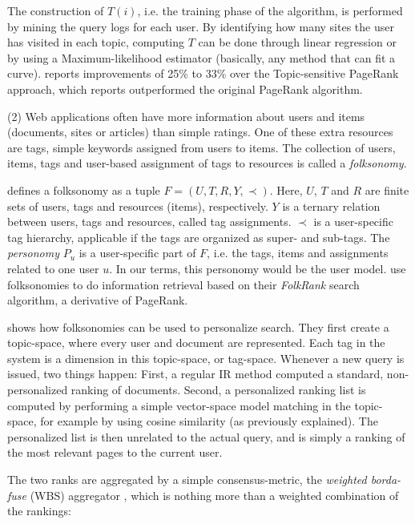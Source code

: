 The construction of $T(i)$, i.e. the training phase of the algorithm, is performed by mining the query logs for each user.
By identifying how many sites the user has visited in each topic, computing $T$ can be done through linear regression or
by using a Maximum-likelihood estimator (basically, any method that can fit a curve).
\citet[p10]{Qiu2006} reports improvements of 25\% to 33\% over the Topic-sensitive PageRank approach, which 
\citet{Haveliwala2003} reports outperformed the original PageRank algorithm.


(2) Web applications often have more information about users and items (documents, sites or articles) 
than simple ratings. One of these extra resources are tags, simple keywords assigned from users to items. 
The collection of users, items, tags and user-based assignment of tags to resources is called a \emph{folksonomy}.

\cite{Hotho} defines a folksonomy as a tuple $F = (U,T,R,Y,\prec)$. 
Here, $U$, $T$ and $R$ are finite sets of users, tags and resources (items), respectively. 
$Y$ is a ternary relation between users, tags and resources, called tag assignments. 
$\prec$ is a user-specific tag hierarchy, applicable if the tags are organized as super- and sub-tags. 
The \emph{personomy} $P_u$ is a user-specific part of $F$, 
i.e. the tags, items and assignments related to one user $u$. 
In our terms, this personomy would be the user model. 
\citeauthor{Hotho} use folksonomies to do information retrieval based on their 
\emph{FolkRank} search algorithm, a derivative of PageRank. 

\cite{Bao2007} shows how folksonomies can be used to personalize search.
They first create a topic-space, where every user and document are represented.
Each tag in the system is a dimension in this topic-space, or tag-space.
Whenever a new query is issued, two things happen: First, a regular IR method
computed a standard, non-personalized ranking of documents.
Second, a personalized ranking list is computed by performing a simple
vector-space model matching in the topic-space, for example by using
cosine similarity (as previously explained). The personalized list
is then unrelated to the actual query, and is simply a ranking of the
most relevant pages to the current user.

The two ranks are aggregated by a simple consensus-metric, the
\emph{weighted borda-fuse} (WBS) aggregator \cite[p3]{Xu2008}, 
which is nothing more than a weighted combination of the rankings:

